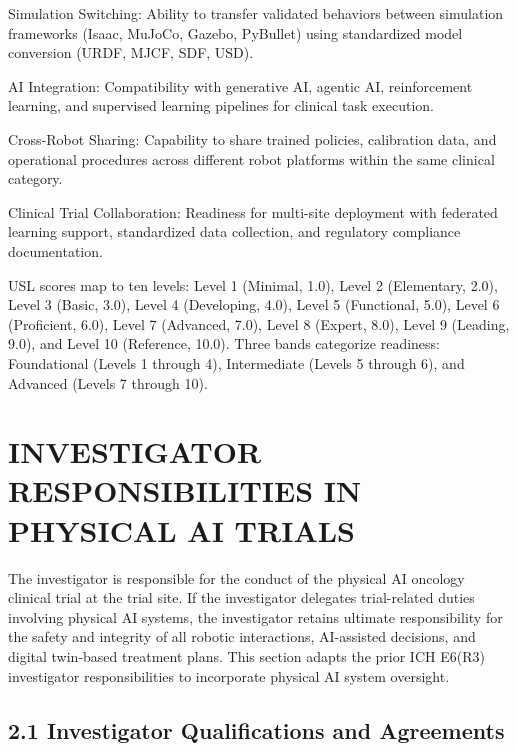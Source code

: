 \documentclass[11pt]{article}
\begin{document}
\begin{description}[leftmargin=2.5cm,style=sameline]

\item[Dimension 1] Simulation Switching: Ability to transfer validated behaviors between simulation frameworks (Isaac, MuJoCo, Gazebo, PyBullet) using standardized model conversion (URDF, MJCF, SDF, USD).

\item[Dimension 2] AI Integration: Compatibility with generative AI, agentic AI, reinforcement learning, and supervised learning pipelines for clinical task execution.

\item[Dimension 3] Cross-Robot Sharing: Capability to share trained policies, calibration data, and operational procedures across different robot platforms within the same clinical category.

\item[Dimension 4] Clinical Trial Collaboration: Readiness for multi-site deployment with federated learning support, standardized data collection, and regulatory compliance documentation.

\end{description}

USL scores map to ten levels: Level 1 (Minimal, 1.0), Level 2 (Elementary, 2.0), Level 3 (Basic, 3.0), Level 4 (Developing, 4.0), Level 5 (Functional, 5.0), Level 6 (Proficient, 6.0), Level 7 (Advanced, 7.0), Level 8 (Expert, 8.0), Level 9 (Leading, 9.0), and Level 10 (Reference, 10.0). Three bands categorize readiness: Foundational (Levels 1 through 4), Intermediate (Levels 5 through 6), and Advanced (Levels 7 through 10).

\section{INVESTIGATOR RESPONSIBILITIES IN PHYSICAL AI TRIALS}

The investigator is responsible for the conduct of the physical AI oncology clinical trial at the trial site. If the investigator delegates trial-related duties involving physical AI systems, the investigator retains ultimate responsibility for the safety and integrity of all robotic interactions, AI-assisted decisions, and digital twin-based treatment plans. This section adapts the prior ICH E6(R3) investigator responsibilities to incorporate physical AI system oversight.

\subsection{2.1 Investigator Qualifications and Agreements}
\end{document}
